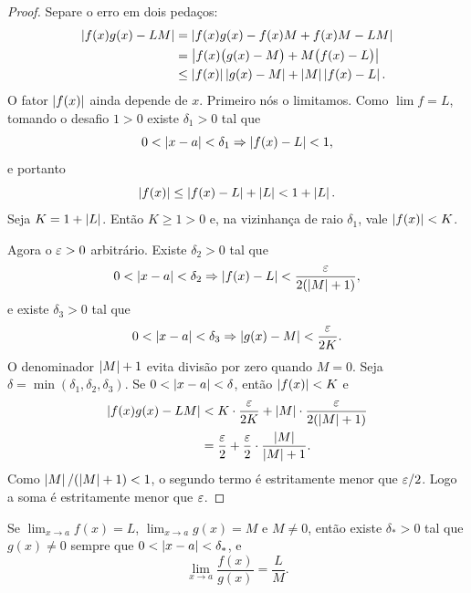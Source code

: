 \documentclass[11pt,a4paper]{article}
\begin{document}
\begin{proof}
Separe o erro em dois peda\c{c}os:
\begin{align*}
\left\lvert f(x)g(x)-LM \right\rvert
&=\left\lvert f(x)g(x)-f(x)M+f(x)M-LM \right\rvert\\
&=\left\lvert f(x)\bigl(g(x)-M\bigr)+M\bigl(f(x)-L\bigr) \right\rvert\\
&\le \left\lvert f(x) \right\rvert\left\lvert g(x)-M \right\rvert+\left\lvert M \right\rvert\left\lvert f(x)-L \right\rvert.
\end{align*}
O fator $\left\lvert f(x) \right\rvert$ ainda depende de $x$. Primeiro n\'os o limitamos. Como $\lim f=L$, tomando o desafio $1>0$ existe $\delta_1>0$ tal que
\[
0<\left\lvert x-a \right\rvert<\delta_1 \Rightarrow \left\lvert f(x)-L \right\rvert<1,
\]
e portanto
\[
\left\lvert f(x) \right\rvert\le \left\lvert f(x)-L \right\rvert+\left\lvert L \right\rvert<1+\left\lvert L \right\rvert.
\]
Seja $K=1+\left\lvert L \right\rvert$. Ent\~ao $K\ge 1>0$ e, na vizinhan\c{c}a de raio $\delta_1$, vale $\left\lvert f(x) \right\rvert<K$.

Agora o $\varepsilon>0$ arbitr\'ario. Existe $\delta_2>0$ tal que
\[
0<\left\lvert x-a \right\rvert<\delta_2 \Rightarrow \left\lvert f(x)-L \right\rvert<\frac{\varepsilon}{2(\left\lvert M \right\rvert+1)},
\]
e existe $\delta_3>0$ tal que
\[
0<\left\lvert x-a \right\rvert<\delta_3 \Rightarrow \left\lvert g(x)-M \right\rvert<\frac{\varepsilon}{2K}.
\]
O denominador $\left\lvert M \right\rvert+1$ evita divis\~ao por zero quando $M=0$. Seja $\delta=\min(\delta_1,\delta_2,\delta_3)$. Se $0<\left\lvert x-a \right\rvert<\delta$, ent\~ao $\left\lvert f(x) \right\rvert<K$ e
\begin{align*}
\left\lvert f(x)g(x)-LM \right\rvert
&< K\cdot\frac{\varepsilon}{2K}+\left\lvert M \right\rvert\cdot\frac{\varepsilon}{2(\left\lvert M \right\rvert+1)}\\
&=\frac{\varepsilon}{2}+\frac{\varepsilon}{2}\cdot\frac{\left\lvert M \right\rvert}{\left\lvert M \right\rvert+1}.
\end{align*}
Como $\left\lvert M \right\rvert/(\left\lvert M \right\rvert+1)<1$, o segundo termo \'e estritamente menor que $\varepsilon/2$. Logo a soma \'e estritamente menor que $\varepsilon$.
\end{proof}

\begin{teorema}[Quociente]
\label{teo:quociente}
Se $\lim_{x\to a}f(x)=L$, $\lim_{x\to a}g(x)=M$ e $M\neq 0$, ent\~ao existe $\delta_*>0$ tal que $g(x)\neq 0$ sempre que $0<\left\lvert x-a \right\rvert<\delta_*$, e
\[
\lim_{x\to a}\frac{f(x)}{g(x)}=\frac{L}{M}.
\]
\end{teorema}
\end{document}
